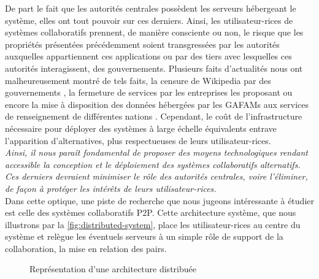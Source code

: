 De part le fait que les autorités centrales possèdent les serveurs hébergeant le système, elles ont tout pouvoir sur ces derniers.
Ainsi, les utilisateur-rices de systèmes collaboratifs prennent, de manière consciente ou non, le risque que les propriétés présentées précédemment soient transgressées par les autorités auxquelles appartiennent ces applications ou par des tiers avec lesquelles ces autorités interagissent, \eg des gouvernements.
Plusieurs faits d'actualités nous ont malheureusement montré de tels faits, \eg la censure de Wikipedia par des gouvernements \cite{2022-wikipedia-censorship}, la fermeture de services par les entreprises les proposant \cite{2022-killed-by-google} ou encore la mise à disposition des données hébergées par les GAFAMs aux services de renseignement de différentes nations \cite{prism-guardian,prism-washington-post}.
Cependant, le coût de l'infrastructure nécessaire pour déployer des systèmes à large échelle équivalents entrave l'apparition d'alternatives, plus respectueuses de leurs utilisateur-rices.\\

\emph{Ainsi, il nous paraît fondamental de proposer des moyens technologiques rendant accessible la conception et le déploiement des systèmes collaboratifs alternatifs.
Ces derniers devraient minimiser le rôle des autorités centrales, voire l'éliminer, de façon à protéger les intérêts de leurs utilisateur-rices.}\\

Dans cette optique, une piste de recherche que nous jugeons intéressante à étudier est celle des systèmes collaboratifs \acf{P2P}.
Cette architecture système, que nous illustrons par la \autoref{fig:distributed-system}, place les utilisateur-rices au centre du système et relègue les éventuels serveurs à un simple rôle de support de la collaboration, \eg la mise en relation des pairs.

\begin{figure}[!ht]
  \centering
  \caption[Caption for distributed-system]{Représentation d'une architecture distribuée\footnotemark[\value{footnote}]}
  \label{fig:distributed-system}
\end{figure}

